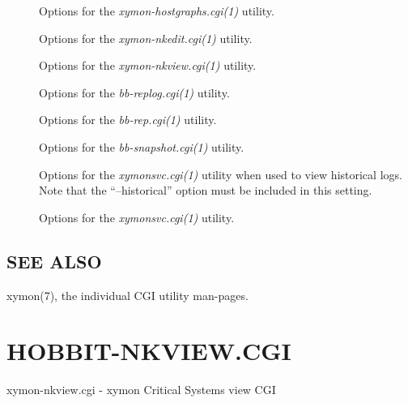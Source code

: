 \begin{description}
 

\item[] Options for the \emph{xymon-hostgraphs.cgi(1)}
 utility. 

 

\item[] Options for the \emph{xymon-nkedit.cgi(1)}
 utility. 

 

\item[] Options for the \emph{xymon-nkview.cgi(1)}
 utility. 

 

\item[] Options for the \emph{bb-replog.cgi(1)}
 utility. 

 

\item[] Options for the \emph{bb-rep.cgi(1)}
 utility. 

 

\item[] Options for the \emph{bb-snapshot.cgi(1)}
 utility. 

 

\item[] Options for the \emph{xymonsvc.cgi(1)}
 utility when used to view historical logs. Note that the ``--historical'' option must be included in this setting. 

 

\item[] Options for the \emph{xymonsvc.cgi(1)}
 utility. 

 


\end{description}
\subsection{SEE ALSO}
xymon(7), the individual CGI utility man-pages. 

%
%
\newpage
\section{HOBBIT-NKVIEW.CGI}

xymon-nkview.cgi - xymon Critical Systems view CGI

